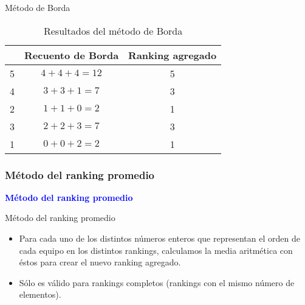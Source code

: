 \documentclass[10pt,hyperref={unicode}]{beamer}
\begin{document}
	\begin{frame}{Método de Borda}
		\begin{ejemplo}[continuación]
			
			\begin{table}[h]
				\centering
				\caption{Resultados del método de Borda}
				\label{tbl:borda_resultados}

				\begin{tabular}{@{}ccc@{}}
					\cmidrule(l){2-3}
					& Recuento de Borda & Ranking agregado \\ \midrule
					5 & $4 + 4 + 4 = 12$       & 5       \\
					4 & $3 + 3 + 1 =  7$       & 3       \\
					2 & $1 + 1 + 0 =  2$       & 1       \\
					3 & $2 + 2 + 3 =  7$       & 3       \\
					1 & $0 + 0 + 2 =  2$       & 1       \\ \bottomrule
				\end{tabular}

			\end{table}
			
		\end{ejemplo}
	\end{frame}
	
	\subsubsection{Método del ranking promedio}
	
	\begin{frame}
		\begin{center}
			\Huge\textbf{\textsf{\textcolor{blue}{Método del ranking promedio}}}
		\end{center}
	\end{frame}
	
	\begin{frame}{Método del ranking promedio}
		\begin{itemize}
			\item Para cada uno de los distintos números enteros que representan el orden de cada equipo en los distintos rankings, calculamos la media aritmética con éstos para crear el nuevo ranking agregado.
			
			\item Sólo es válido para rankings completos (rankings con el mismo número de elementos).
		\end{itemize}
	\end{frame}
	
\end{document}
